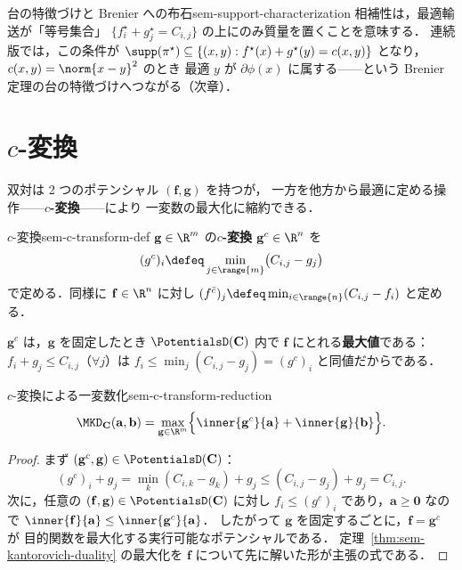 \begin{remark}{台の特徴づけと Brenier への布石}{sem-support-characterization}
  相補性は，最適輸送が「等号集合」
  $\{f^\star_i + g^\star_j = C_{i,j}\}$ の上にのみ質量を置くことを意味する．
  連続版では，この条件が
  $\supp(\pi^\star) \subseteq \{(x,y) : f^\star(x) + g^\star(y) = c(x,y)\}$
  となり，$c(x,y) = \norm{x-y}^2$ のとき
  最適 $y$ が $\partial\phi(x)$ に属する——という
  Brenier 定理の台の特徴づけへつながる（次章）．
\end{remark}

\section{\texorpdfstring{$c$}{c}-変換}
\label{sec:sem-c-transform}

双対は 2 つのポテンシャル $(\mathbf{f}, \mathbf{g})$ を持つが，
一方を他方から最適に定める操作——\textbf{$c$-変換}——により
一変数の最大化に縮約できる．

\begin{definition}{$c$-変換}{sem-c-transform-def}
  $\mathbf{g} \in \R^m$ の\textbf{$c$-変換} $\mathbf{g}^c \in \R^n$ を
  \[
    (g^c)_i \defeq \min_{j \in \range{m}} \bigl(C_{i,j} - g_j\bigr)
  \]
  で定める．同様に $\mathbf{f} \in \R^n$ に対し
  $(f^{\bar c})_j \defeq \min_{i \in \range{n}}(C_{i,j} - f_i)$ と定める．
\end{definition}

$\mathbf{g}^c$ は，$\mathbf{g}$ を固定したとき
$\PotentialsD(\mathbf{C})$ 内で $\mathbf{f}$ にとれる\textbf{最大値}である：
$f_i + g_j \leq C_{i,j}$（$\forall j$）は
$f_i \leq \min_j(C_{i,j} - g_j) = (g^c)_i$ と同値だからである．

\begin{proposition}{$c$-変換による一変数化}{sem-c-transform-reduction}
  \[
    \MKD_{\mathbf{C}}(\mathbf{a}, \mathbf{b})
    = \max_{\mathbf{g} \in \R^m}
      \Bigl\{
        \inner{\mathbf{g}^c}{\mathbf{a}} + \inner{\mathbf{g}}{\mathbf{b}}
      \Bigr\}.
  \]
\end{proposition}

\begin{proof}
  まず $(\mathbf{g}^c, \mathbf{g}) \in \PotentialsD(\mathbf{C})$：
  \[
    (g^c)_i + g_j
    = \min_k (C_{i,k} - g_k) + g_j
    \leq (C_{i,j} - g_j) + g_j
    = C_{i,j}.
  \]
  次に，任意の $(\mathbf{f}, \mathbf{g}) \in \PotentialsD(\mathbf{C})$ に対し
  $f_i \leq (g^c)_i$ であり，$\mathbf{a} \geq \mathbf{0}$ なので
  $\inner{\mathbf{f}}{\mathbf{a}} \leq \inner{\mathbf{g}^c}{\mathbf{a}}$．
  したがって $\mathbf{g}$ を固定するごとに，$\mathbf{f} = \mathbf{g}^c$ が
  目的関数を最大化する実行可能なポテンシャルである．
  定理~\ref{thm:sem-kantorovich-duality} の最大化を
  $\mathbf{f}$ について先に解いた形が主張の式である．
\end{proof}

